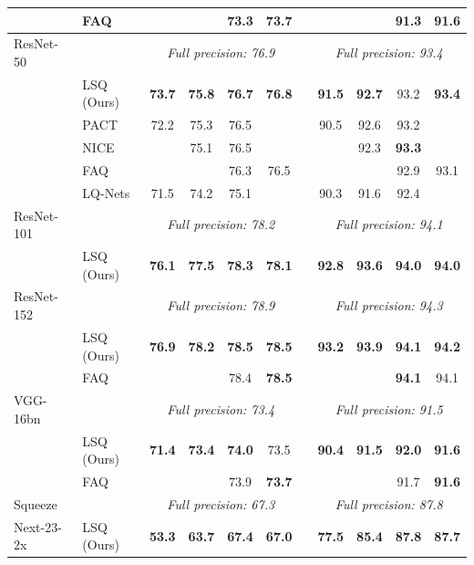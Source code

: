 \documentclass{article}
\newcommand{\tb}{\textbf} %
\begin{document}
\begin{table}[bt]
\begin{center}
\begin{tabular}{l l cccc c cccc}
					&	FAQ				& 		& 		& 73.3	& 73.7	&	&		&		& 91.3	& 91.6 \\	
		\midrule		
		ResNet-50	& & \multicolumn{4}{c}{{\textit{Full precision: 76.9}}} & & \multicolumn{4}{c}{{\textit{Full precision: 93.4}}} \\		
					&	LSQ (Ours) 	 	& \tb{73.7}&\tb{75.8}	& \tb{76.7}	& \tb{76.8}	&	& \tb{91.5}	& \tb{92.7}	& 93.2	& \tb{93.4} \\
					&	PACT			& 72.2	& 75.3	& 76.5	&		& 	& 90.5	& 92.6	& 93.2	& \\
					& 	NICE			& 		& 75.1   	& 76.5	&		&	& 		& 92.3	& \tb{93.3}	& \\		
					&	FAQ				& 		&		& 76.3	& 76.5 	&	&		&		& 92.9	& 93.1 \\	
					& 	LQ-Nets			& 71.5	& 74.2	& 75.1	&		&	& 90.3	& 91.6	& 92.4	& \\	
		\midrule		
		ResNet-101	& & \multicolumn{4}{c}{{\textit{Full precision: 78.2}}} & & \multicolumn{4}{c}{{\textit{Full precision: 94.1}}} \\
					&	LSQ (Ours) 	 	& \tb{76.1}	& \tb{77.5}	& \tb{78.3}	& \tb{78.1}	&	& \tb{92.8}	& \tb{93.6}	& \tb{94.0}	& \tb{94.0} \\		
		\midrule		
		ResNet-152	& & \multicolumn{4}{c}{{\textit{Full precision: 78.9}}} & & \multicolumn{4}{c}{{\textit{Full precision: 94.3}}} \\		
					&	LSQ (Ours) 		& \tb{76.9}	& \tb{78.2}	& \tb{78.5}	& \tb{78.5}	& 	& \tb{93.2}	& \tb{93.9}	& \tb{94.1} & \tb{94.2} \\
					&	FAQ				& 		& 		& 78.4	& \tb{78.5}	& 	& 		& 		& \tb{94.1} 	& 94.1 \\
		\midrule		
		VGG-16bn	& & \multicolumn{4}{c}{{\textit{Full precision: 73.4}}} & & \multicolumn{4}{c}{{\textit{Full precision: 91.5}}} \\		
					&	LSQ (Ours) 		& \tb{71.4}	& \tb{73.4}	& \tb{74.0}	& 73.5 &	& \tb{90.4}	& \tb{91.5}	& \tb{92.0}	& \tb{91.6} \\	
					&	FAQ				& 		& 		& 73.9	& \tb{73.7} &	& 	& 		& 91.7	& \tb{91.6} \\
		\midrule		
		Squeeze		& & \multicolumn{4}{c}{{\textit{Full precision: 67.3}}} & & \multicolumn{4}{c}{{\textit{Full precision: 87.8}}} \\		
		Next-23-2x	&	LSQ (Ours) 		& \tb{53.3}	& \tb{63.7}	&\tb{ 67.4}	& \tb{67.0} &	& \tb{77.5}	& \tb{85.4}	& \tb{87.8}	& \tb{87.7} \\%
		\bottomrule		
	\end{tabular}
	\end{center}
\end{table}
\end{document}

